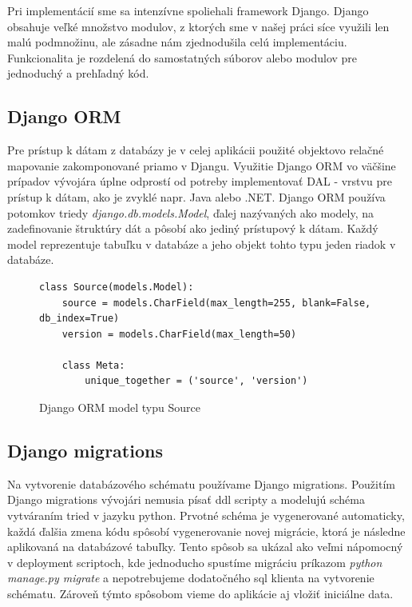  
Pri implementácií sme sa intenzívne spoliehali framework Django. Django obsahuje veľké množstvo modulov, z ktorých sme v našej práci síce využili len malú podmnožinu, ale zásadne nám zjednodušila celú implementáciu. Funkcionalita je rozdelená do samostatných súborov alebo modulov pre jednoduchý a prehľadný kód.

\subsection{Django ORM}
Pre prístup k dátam z databázy je v celej aplikácii použité objektovo relačné mapovanie zakomponované priamo v Djangu. Využitie Django ORM vo väčšine prípadov vývojára úplne odprostí od potreby implementovať DAL - vrstvu pre prístup k dátam, ako je zvyklé napr. Java alebo .NET. Django ORM používa potomkov triedy \emph{django.db.models.Model}, ďalej nazývaných ako modely, na zadefinovanie štruktúry dát a pôsobí ako jediný prístupový k dátam. Každý model reprezentuje tabuľku v databáze a jeho objekt tohto typu jeden riadok v databáze. 

\begin{figure}[htbp]
\centering
\begin{minipage}{0.9\textwidth}
\lstset{columns=flexible,breaklines=true,breakatwhitespace=true, showstringspaces=false}
\begin{lstlisting}
class Source(models.Model):
    source = models.CharField(max_length=255, blank=False, db_index=True)
    version = models.CharField(max_length=50)

    class Meta:
        unique_together = ('source', 'version')
\end{lstlisting} 		
\end{minipage} 
\caption{Django ORM model typu Source}
\label{fig:static-analysis}
\end{figure}

\subsection{Django migrations}
Na vytvorenie databázového schématu používame Django migrations. Použitím Django migrations vývojári nemusia písať ddl scripty a modelujú schéma vytváraním tried v jazyku python. Prvotné schéma je vygenerované automaticky, každá ďalšia zmena kódu spôsobí vygenerovanie novej migrácie, ktorá je následne aplikovaná na databázové tabuľky. Tento spôsob sa ukázal ako veľmi nápomocný v deployment scriptoch, kde jednoducho spustíme migráciu príkazom \emph{python manage.py migrate} a nepotrebujeme dodatočného sql klienta na vytvorenie schématu. Zároveň týmto spôsobom vieme do aplikácie aj vložiť iniciálne data.

